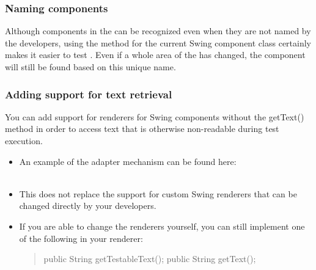 
\subsubsection{Naming components}
Although components in the \gdaut{} can be recognized even  when they are not named by the developers, using the  method for the current Swing component class certainly makes it easier to test \gdauts{}. Even if a whole area of the \gdaut{} has changed, the component will still be found based on this unique name. 

\subsubsection{Adding support for text retrieval}
You can add support for renderers for Swing components without the getText() method in order to access text that is otherwise non-readable during test execution. 
\begin{itemize}
\item An example of the adapter mechanism can be found here:\\
\\
\item This does not replace the support for custom Swing renderers that can be changed directly by your developers. 
\item If you are able to change the renderers yourself, you can still implement one of the following in your renderer:
\begin{quote}
public String getTestableText();
public String getText();
\end{quote}
\end{itemize}
